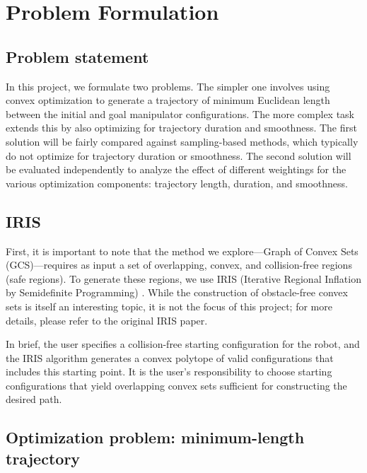 \section{Problem Formulation}\label{sec:formulation}

\subsection{Problem statement}
In this project, we formulate two problems. The simpler one involves using convex optimization to generate a trajectory of minimum Euclidean length between the initial and goal manipulator configurations. The more complex task extends this by also optimizing for trajectory duration and smoothness. The first solution will be fairly compared against sampling-based methods, which typically do not optimize for trajectory duration or smoothness. The second solution will be evaluated independently to analyze the effect of different weightings for the various optimization components: trajectory length, duration, and smoothness.

\subsection{IRIS}
First, it is important to note that the method we explore—Graph of Convex Sets (GCS)—requires as input a set of overlapping, convex, and collision-free regions (safe regions). To generate these regions, we use IRIS (Iterative Regional Inflation by Semidefinite Programming) \cite{iris}. While the construction of obstacle-free convex sets is itself an interesting topic, it is not the focus of this project; for more details, please refer to the original IRIS paper.

In brief, the user specifies a collision-free starting configuration for the robot, and the IRIS algorithm generates a convex polytope of valid configurations that includes this starting point. It is the user's responsibility to choose starting configurations that yield overlapping convex sets sufficient for constructing the desired path.

\subsection{Optimization problem: minimum-length trajectory}\label{sec:optimization_problem}

